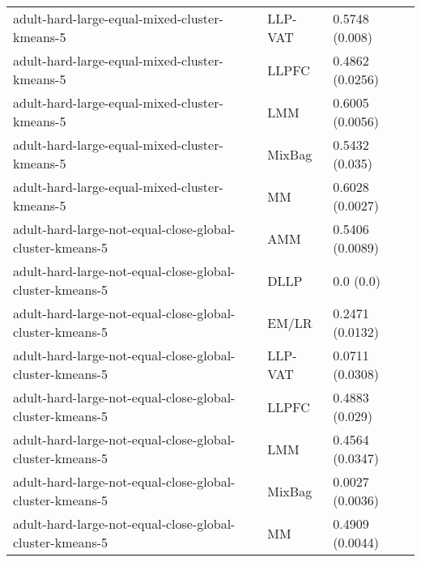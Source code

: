 \begin{longtable}{lll}
                                                                adult-hard-large-equal-mixed-cluster-kmeans-5 &   LLP-VAT &                            0.5748 (0.008) \\
                                                                adult-hard-large-equal-mixed-cluster-kmeans-5 &     LLPFC &                           0.4862 (0.0256) \\
                                                                adult-hard-large-equal-mixed-cluster-kmeans-5 &       LMM &                           0.6005 (0.0056) \\
                                                                adult-hard-large-equal-mixed-cluster-kmeans-5 &    MixBag &                            0.5432 (0.035) \\
                                                                adult-hard-large-equal-mixed-cluster-kmeans-5 &        MM &                           0.6028 (0.0027) \\
                                                     adult-hard-large-not-equal-close-global-cluster-kmeans-5 &       AMM &                           0.5406 (0.0089) \\
                                                     adult-hard-large-not-equal-close-global-cluster-kmeans-5 &      DLLP &                                 0.0 (0.0) \\
                                                     adult-hard-large-not-equal-close-global-cluster-kmeans-5 &     EM/LR &                           0.2471 (0.0132) \\
                                                     adult-hard-large-not-equal-close-global-cluster-kmeans-5 &   LLP-VAT &                           0.0711 (0.0308) \\
                                                     adult-hard-large-not-equal-close-global-cluster-kmeans-5 &     LLPFC &                            0.4883 (0.029) \\
                                                     adult-hard-large-not-equal-close-global-cluster-kmeans-5 &       LMM &                           0.4564 (0.0347) \\
                                                     adult-hard-large-not-equal-close-global-cluster-kmeans-5 &    MixBag &                           0.0027 (0.0036) \\
                                                     adult-hard-large-not-equal-close-global-cluster-kmeans-5 &        MM &                           0.4909 (0.0044) \\

\end{longtable}
